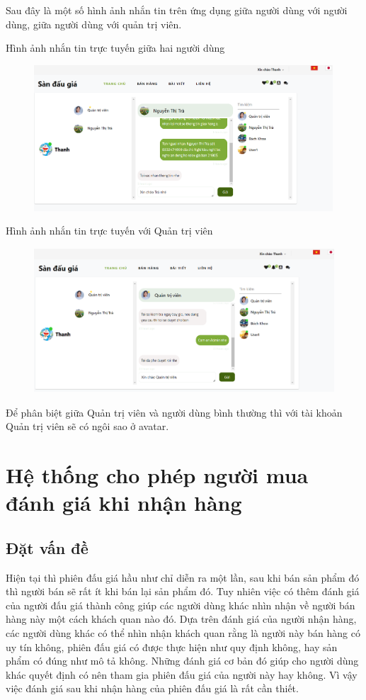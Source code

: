 \documentclass[../DoAn.tex]{subfiles}
\begin{document}
Sau đây là một số hình ảnh nhắn tin trên ứng dụng giữa người dùng với người dùng, giữa người dùng với quản trị viên. 

Hình ảnh nhắn tin trực tuyến giữa hai người dùng
\begin{figure}[H]
    \centering
    \includegraphics[width=0.75\linewidth,height=5.45cm]{Hinhve/chatuser.png}
\end{figure}
Hình ảnh nhắn tin trực tuyến với Quản trị viên
\begin{figure}[H]
    \centering
    \includegraphics[width=0.75\linewidth,height=5.4cm]{Hinhve/chatadmin.png}
\end{figure}
Để phân biệt giữa Quản trị viên và người dùng bình thường thì với tài khoản Quản trị viên sẽ có ngôi sao ở avatar.
\section{Hệ thống cho phép người mua đánh giá khi nhận hàng}
\subsection{Đặt vấn đề}
Hiện tại thì phiên đấu giá hầu như chỉ diễn ra một lần, sau khi bán sản phẩm đó thì người bán sẽ rất ít khi bán lại sản phẩm đó. Tuy nhiên việc có thêm đánh giá của người đấu giá thành công giúp các người dùng khác nhìn nhận về người bán hàng này một cách khách quan nào đó. Dựa trên đánh giá của người nhận hàng, các người dùng khác có thể nhìn nhận khách quan rằng là người này bán hàng có uy tín không, phiên đấu giá có được thực hiện như quy định không, hay sản phẩm có đúng như mô tả không. Những đánh giá cơ bản đó giúp cho người dùng khác quyết định có nên tham gia phiên đấu giá của người này hay không. Vì vậy việc đánh giá sau khi nhận hàng của phiên đấu giá là rất cần thiết. 
\end{document}

